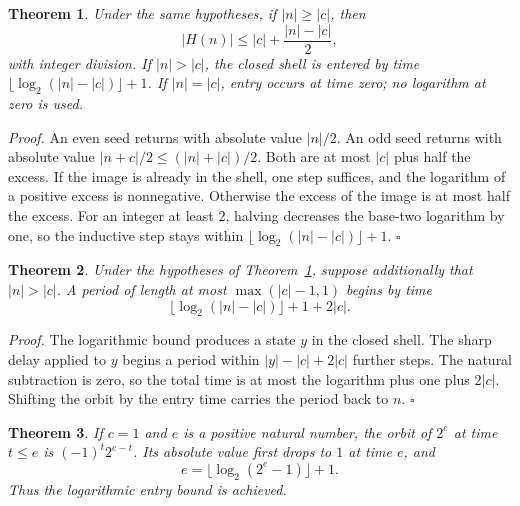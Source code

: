 \documentclass[11pt,letterpaper]{article}
\newtheorem{theorem}{Theorem}
\newenvironment{proof}{\noindent\textit{Proof.}}{\hfill\(\square\)}
\begin{document}
\begin{theorem}
\label{thm:negtwolog}
Under the same hypotheses, if \(\lvert n\rvert\ge\lvert c\rvert\), then
\[
\lvert H(n)\rvert\le\lvert c\rvert+\frac{\lvert n\rvert-\lvert c\rvert}{2},
\]
with integer division. If \(\lvert n\rvert>\lvert c\rvert\), the closed shell is entered by time \(\lfloor\log_{2}(\lvert n\rvert-\lvert c\rvert)\rfloor+1\). If \(\lvert n\rvert=\lvert c\rvert\), entry occurs at time zero; no logarithm at zero is used.
\end{theorem}

\begin{proof}
An even seed returns with absolute value \(\lvert n\rvert/2\). An odd seed returns with absolute value \(\lvert n+c\rvert/2\le(\lvert n\rvert+\lvert c\rvert)/2\). Both are at most \(\lvert c\rvert\) plus half the excess. If the image is already in the shell, one step suffices, and the logarithm of a positive excess is nonnegative. Otherwise the excess of the image is at most half the excess. For an integer at least \(2\), halving decreases the base-two logarithm by one, so the inductive step stays within \(\lfloor\log_{2}(\lvert n\rvert-\lvert c\rvert)\rfloor+1\).
\end{proof}

\begin{theorem}
\label{thm:negtwologdelay}
Under the hypotheses of Theorem~\ref{thm:negtwolog}, suppose additionally that \(\lvert n\rvert>\lvert c\rvert\). A period of length at most \(\max(\lvert c\rvert-1,1)\) begins by time
\[
\lfloor\log_{2}(\lvert n\rvert-\lvert c\rvert)\rfloor+1+2\lvert c\rvert.
\]
\end{theorem}

\begin{proof}
The logarithmic bound produces a state \(y\) in the closed shell. The sharp delay applied to \(y\) begins a period within \(\lvert y\rvert-\lvert c\rvert+2\lvert c\rvert\) further steps. The natural subtraction is zero, so the total time is at most the logarithm plus one plus \(2\lvert c\rvert\). Shifting the orbit by the entry time carries the period back to \(n\).
\end{proof}

\begin{theorem}
\label{thm:negtwopower}
If \(c=1\) and \(e\) is a positive natural number, the orbit of \(2^{e}\) at time \(t\le e\) is \((-1)^{t}2^{e-t}\). Its absolute value first drops to \(1\) at time \(e\), and
\[
e=\lfloor\log_{2}(2^{e}-1)\rfloor+1.
\]
Thus the logarithmic entry bound is achieved.
\end{theorem}
\end{document}
